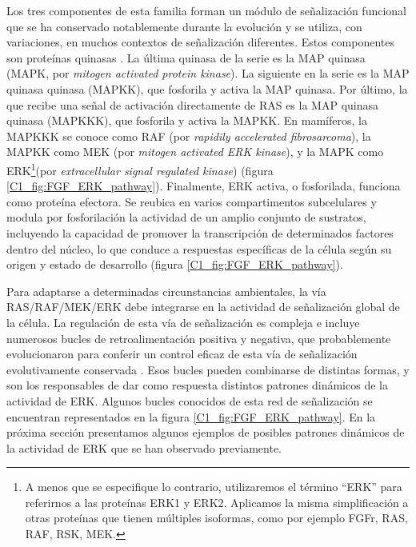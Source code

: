 \documentclass[./main.tex]{subfiles}
\begin{document}
Los tres componentes de esta familia forman un módulo de señalización funcional que se ha conservado notablemente durante la evolución y se utiliza, con variaciones, en muchos contextos de señalización diferentes. Estos componentes son proteínas quinasas \cite{Roux2004}. La última quinasa de la serie es la MAP quinasa (MAPK, por \textit{mitogen activated protein kinase}). La siguiente en la serie es la MAP quinasa quinasa (MAPKK), que fosforila y activa la MAP quinasa. Por último, la que recibe una señal de activación directamente de RAS es la MAP quinasa quinasa (MAPKKK), que fosforila y activa la MAPKK. En mamíferos, la MAPKKK se conoce como RAF (por \textit{rapidily accelerated fibrosarcoma}), la MAPKK como MEK (por \textit{mitogen activated ERK kinase}), y la MAPK como ERK\footnote{A menos que se especifique lo contrario, utilizaremos el término ``ERK''  para referirnos a las proteínas ERK1 y ERK2. Aplicamos la misma simplificación a otras proteínas que tienen múltiples isoformas, como por ejemplo FGFr, RAS, RAF, RSK, MEK.}(por \textit{extracellular signal regulated kinase}) (figura \ref{C1_fig:FGF_ERK_pathway}). Finalmente, ERK activa, o fosforilada, funciona como proteína efectora. Se reubica en varios compartimentos subcelulares y modula por fosforilación la actividad de un amplio conjunto de sustratos, incluyendo la capacidad de promover la transcripción de determinados factores dentro del núcleo, lo que conduce a respuestas específicas de la célula según su origen y estado de desarrollo (figura \ref{C1_fig:FGF_ERK_pathway}).


Para adaptarse a determinadas circunstancias ambientales, la vía RAS/RAF/MEK/ERK debe integrarse en la actividad de señalización global de la célula. La regulación de esta vía de señalización es compleja e incluye numerosos bucles de retroalimentación positiva y negativa, que probablemente evolucionaron para conferir un control eficaz de esta vía de señalización evolutivamente conservada \cite{Lake2016,Dougherty2005,Ekerot2008,Lavoie2015,Lemmon2016,Nett2018,Sturm2010}. Esos bucles pueden combinarse de distintas formas, y son los responsables de dar como respuesta distintos patrones dinámicos de la actividad de ERK. Algunos bucles conocidos de esta red de señalización se encuentran representados en la figura \ref{C1_fig:FGF_ERK_pathway}. En la próxima sección presentamos algunos ejemplos de posibles patrones dinámicos de la actividad de ERK que se han observado previamente. 


\end{document}
